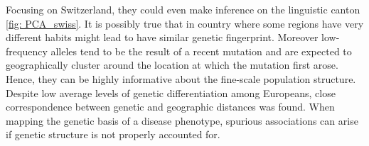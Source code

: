 		Focusing on Switzerland, they could even make inference on the linguistic canton \ref{fig: PCA_swiss}.
		It is possibly true that in country where some regions have very different habits might lead to have similar genetic fingerprint.
		Moreover low-frequency alleles tend to be the result of a recent mutation and are expected to geographically cluster around the location at which the mutation first arose.
		Hence, they can be highly informative about the fine-scale population structure.
		Despite low average levels of genetic differentiation among Europeans, close correspondence between genetic and geographic distances was found.
		When mapping the genetic basis of a disease phenotype, spurious associations can arise if genetic structure is not properly accounted for.
